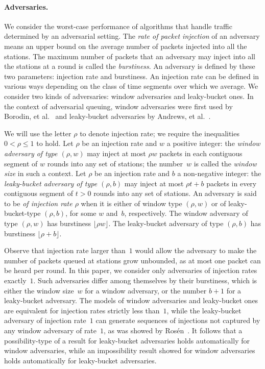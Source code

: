 \documentclass[11pt]{article}
\newcommand{\BBB}{\vspace*{-\bigskipamount}}
\newcommand{\Paragraph}[1]{\BBB\paragraph{#1}}
\begin{document}

\Paragraph{Adversaries.}



We consider the worst-case performance of algorithms that handle traffic determined by an adversarial setting.
The \emph{rate of packet injection} of an adversary means an upper bound on the average number of packets injected into all the stations.
The maximum number of packets that an adversary may inject into all the stations at a round is called the  \emph{burstiness}.
An adversary is defined by these two parameters: injection rate and burstiness.
An injection rate can be defined in various ways depending on the class of time segments  over which we average.
We consider two kinds of adversaries: window adversaries and leaky-bucket ones.
In the context of adversarial queuing, window adversaries were first used by Borodin, et al.~\cite{BorodinKRSW-JACM01} and leaky-bucket adversaries by Andrews, et al.~\cite{AndrewsAFLLK-JACM01}.

We will use the letter $\rho$ to denote injection rate; we require the inequalities $0<\rho\le 1$ to hold.
Let $\rho$ be an injection rate and $w$ a positive integer:
the \emph{window adversary of type $(\rho,w)$} may inject at most $\rho w$ packets in each contiguous segment of $w$ rounds into any set of stations; the number~$w$ is called the \emph{window size} in such a context.
Let $\rho$ be an injection rate and $b$ a non-negative integer:
the \emph{leaky-bucket adversary of type $(\rho,b)$} may inject at most $\rho t+b$ packets in every contiguous segment of $t>0$ rounds into any set of stations.
An adversary is said to be \emph{of injection rate $\rho$} when it is either of window type $(\rho,w)$ or of leaky-bucket-type $(\rho,b)$, for some $w$ and~$b$, respectively.
The window adversary of type $(\rho,w)$ has burstiness $\lfloor \rho w\rfloor$.
The leaky-bucket adversary of type $(\rho,b)$ has burstiness $\lfloor \rho+b\rfloor$.

Observe that injection rate larger than~$1$ would allow the adversary to make the number of packets queued at stations grow unbounded, as at most one packet can be heard  per round.
In this paper, we consider only adversaries of injection rates exactly~$1$.
Such adversaries differ among themselves by their burstiness, which is either the window size~$w$ for a window adversary, or the number $b+1$ for a leaky-bucket adversary.
The models of window adversaries and leaky-bucket ones are equivalent for injection rates strictly less than~$1$, while the leaky-bucket adversary of injection rate~$1$ can generate sequences of injections not captured by any window adversary of rate~$1$, as was showed by Ros\' en~\cite{Rosen-IPL02}.
It follows that a possibility-type of a result for leaky-bucket adversaries holds automatically for window adversaries, while an impossibility result showed for window adversaries holds automatically for leaky-bucket adversaries.
\end{document}
